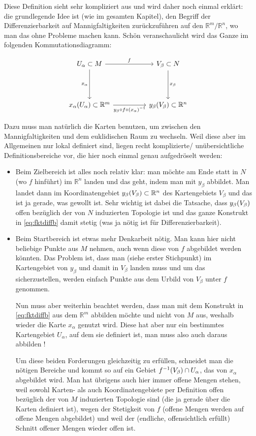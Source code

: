 \documentclass[../H_Analysis_main.tex]{subfiles}
\begin{document}
Diese Definition sieht sehr kompliziert aus und wird daher noch einmal erklärt: die grundlegende Idee ist (wie im gesamten Kapitel), den Begriff der Differenzierbarkeit auf Mannigfaltigkeiten zurückzuführen auf den $\mathbb{R}^m / \mathbb{R}^n$, wo man das ohne Probleme machen kann. Schön veranschaulicht wird das Ganze im folgenden Kommutationsdiagramm:

$$
\begin{tikzcd}[row sep=42pt]
U_\alpha \subset M \ar{rr}{f} \ar{d}[swap]{x_\alpha} & & V_\beta \subset N \ar{d}{x_\beta} \\
x_\alpha(U_\alpha) \subset \mathbb{R}^m \ar{rr}[swap]{y_\beta \circ f \circ \qty(x_\alpha)^{-1}} & & y_\beta(V_\beta) \subset \mathbb{R}^n
\end{tikzcd}
$$

Dazu muss man natürlich die Karten benutzen, um zwischen den Mannigfaltigkeiten und dem euklidischen Raum zu wechseln. Weil diese aber im Allgemeinen nur lokal definiert sind, liegen recht komplizierte/ unübersichtliche Definitionsbereiche vor, die hier noch einmal genau aufgedröselt werden:
\begin{itemize}
\item Beim Zielbereich ist alles noch relativ klar: man möchte am Ende statt in $N$ (wo $f$ hinführt) im $\mathbb{R}^n$ landen und das geht, indem man mit $y_\beta$ abbildet. Man landet dann im Koordinatengebiet $y_\beta\qty(V_\beta) \subset \mathbb{R}^n$ des Kartengebiets $V_\beta$ und das ist ja gerade, was gewollt ist. Sehr wichtig ist dabei die Tatsache, dass $y_\beta\qty(V_\beta)$ offen bezüglich der von $N$ induzierten Topologie ist und das ganze Konstrukt in \eqref{eq:fktdiffb} damit stetig (was ja nötig ist für Differenzierbarkeit).

\item Beim Startbereich ist etwas mehr Denkarbeit nötig. Man kann hier nicht beliebige Punkte aus $M$ nehmen, auch wenn diese von $f$ abgebildet werden könnten. Das Problem ist, dass man (siehe erster Stichpunkt) im Kartengebiet von $y_\beta$ und damit in $V_\beta$ landen muss und um das sicherzustellen, werden einfach Punkte aus dem Urbild von $V_\beta$ unter $f$ genommen.

Nun muss aber weiterhin beachtet werden, dass man mit dem Konstrukt in \eqref{eq:fktdiffb} aus dem $\mathbb{R}^m$ abbilden möchte und nicht von $M$ aus, weshalb wieder die Karte $x_\alpha$ genutzt wird. Diese hat aber nur ein bestimmtes Kartengebiet $U_\alpha$, auf dem sie definiert ist, man muss also auch daraus abbilden !

Um diese beiden Forderungen gleichzeitig zu erfüllen, schneidet man die nötigen Bereiche und kommt so auf ein Gebiet $f^{-1}\qty(V_\beta) \cap U_\alpha$, das von $x_\alpha$ abgebildet wird. Man hat übrigens auch hier immer offene Mengen stehen, weil sowohl Karten- als auch Koordinatengebiete per Definition offen bezüglich der von $M$ induzierten Topologie sind (die ja gerade über die Karten definiert ist), wegen der Stetigkeit von $f$ (offene Mengen werden auf offene Mengen abgebildet) und weil der (endliche, offensichtlich erfüllt) Schnitt offener Mengen wieder offen ist.
\end{itemize}
\end{document}
